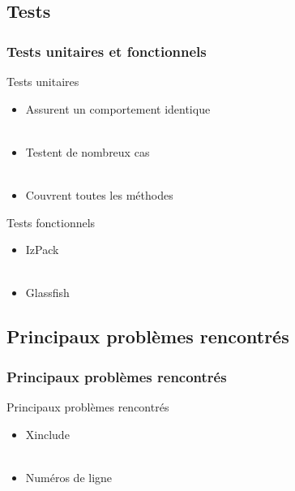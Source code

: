 \subsection{Tests}
\begin{frame}\frametitle{Tests unitaires et fonctionnels}
\begin{minipage}[c]{.9\linewidth}
\begin{beamerboxesrounded}[shadow=true]{Tests unitaires}
\begin{itemize}
	\item Assurent un comportement identique\\
	~\\
	\item Testent de nombreux cas\\
	~\\
	\item Couvrent toutes les méthodes\\
\end{itemize}
\end{beamerboxesrounded}
\end{minipage}
\vfill
\begin{minipage}[c]{.9\linewidth}
\begin{beamerboxesrounded}[shadow=true]{Tests fonctionnels}
\begin{itemize}
	\item IzPack\\
	~\\
	\item Glassfish
\end{itemize}
\end{beamerboxesrounded}
\end{minipage}
\end{frame}

\subsection{Principaux problèmes rencontrés}
\begin{frame}\frametitle{Principaux problèmes rencontrés}
\begin{beamerboxesrounded}[shadow=true]{Principaux problèmes rencontrés}
\begin{itemize}
	\item Xinclude\\
	~\\
	\item Numéros de ligne
\end{itemize}
\end{beamerboxesrounded}
\end{frame}
